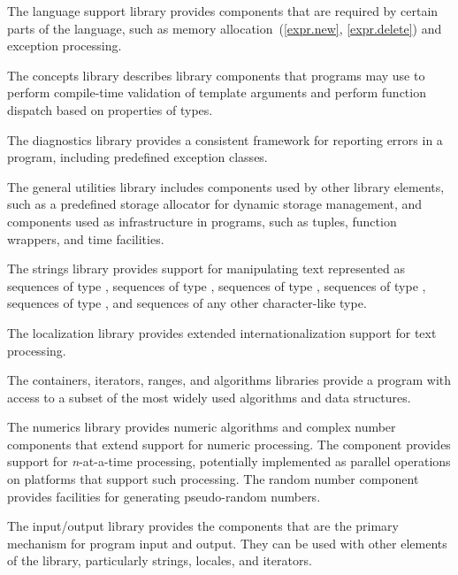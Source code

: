 \pnum
The language support library provides components that are
required by certain parts of the \Cpp{} language, such as memory allocation~(\ref{expr.new},
\ref{expr.delete}) and exception processing.

\pnum
The concepts library describes library components that \Cpp{}
programs may use to perform compile-time validation of template arguments and
perform function dispatch based on properties of types.

\pnum
The diagnostics library provides a consistent framework for
reporting errors in a \Cpp{} program, including predefined exception classes.

\pnum
The general utilities library includes components used
by other library elements, such as a predefined storage allocator for dynamic
storage management, and components used
as infrastructure
in \Cpp{} programs,
such as tuples, function wrappers, and time facilities.

\pnum
The strings library provides support for manipulating text represented
as sequences of type ,
sequences of type ,
sequences of type ,
sequences of type ,
sequences of type ,
and sequences of any other character-like type.

\pnum
The localization library provides extended internationalization
support for text processing.

\pnum
The containers, iterators, ranges,
and algorithms libraries provide a \Cpp{} program with access
to a subset of the most widely used algorithms and data structures.

\pnum
The numerics library provides
numeric algorithms and complex number components that extend support for numeric processing.
The
component provides support for
\textit{n}-at-a-time
processing,
potentially implemented as parallel operations on platforms that support such processing.
The random number component provides facilities for generating pseudo-random numbers.

\pnum
The input/output library provides the
components that are the primary mechanism for \Cpp{} program input and output.
They can be used with other elements of the library, particularly
strings, locales, and iterators.


